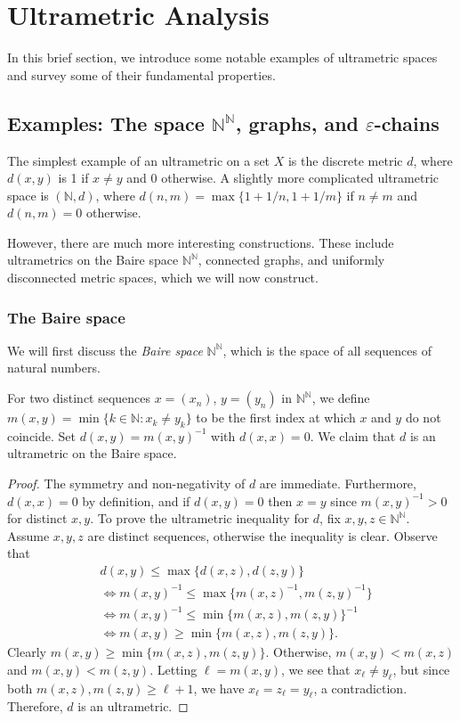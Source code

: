\section{Ultrametric Analysis}
In this brief section, we introduce some notable examples of ultrametric spaces and survey some of their fundamental properties.
\subsection{Examples: The space \( \mathbb{N} ^{\mathbb{N} } \), graphs, and \( \varepsilon  \)-chains} The simplest example of an ultrametric on a set $X$ is the discrete metric $d$, where $d(x,y)$ is 1 if $x \neq y$ and 0 otherwise. A slightly more complicated ultrametric space is \( (\mathbb{N} , d) \), where \( d(n,m) = \max \{ 1 + 1/n , 1 + 1/m \}  \) if \( n \neq m \) and \( d(n, m) = 0 \) otherwise.

However, there are much more interesting constructions. These include ultrametrics on the Baire space $\mathbb{N} ^{\mathbb{N} }$, connected graphs, and uniformly disconnected metric spaces, which we will now construct.

\subsubsection{The Baire space} We will first discuss the \emph{Baire space} \( \mathbb{N} ^{\mathbb{N} }  \), which is the space of all sequences of natural numbers.

For two distinct sequences \( x =  (x_{n}) \), \( y = (y_{n}) \) in \( \mathbb{N}^{\mathbb{N}}   \), we define \( m(x,y) = \min \{ k \in \mathbb{N} : x_{k} \neq y_{k}  \}  \) to be the first index at which \( x \) and \( y \) do not coincide. Set \( d(x,y) = m(x,y)^{-1}  \) with \( d(x,x) = 0 \). We claim that \( d \) is an ultrametric on the Baire space.
\begin{proof}
The symmetry and non-negativity of \( d \) are immediate. Furthermore, \( d(x,x) = 0 \) by definition, and if \( d(x,y) = 0  \) then \( x = y \) since \( m(x,y)^{-1} > 0 \) for distinct \( x,y \). To prove the ultrametric inequality for \( d \), fix \( x,y,z \in \mathbb{N} ^{\mathbb{N} }  \). Assume \( x,y,z \) are distinct sequences, otherwise the inequality is clear. Observe that
\begin{align*}
	&d(x,y) \leq \max \{ d(x,z), d(z,y) \} \\
	&\Leftrightarrow m(x,y)^{-1} \leq \max \{ m(x,z)^{-1} , m(z,y)^{-1}  \}  \\
	&\Leftrightarrow m(x,y)^{-1}  \leq \min \{ m(x,z), m(z,y) \} ^{-1} \\
	&\Leftrightarrow m(x,y) \geq \min \{ m(x,z), m(z,y) \}.
\end{align*}
Clearly \( m(x,y) \geq \min \{ m(x,z), m(z,y) \}  \). Otherwise, \( m(x,y) < m(x,z) \) and \( m(x,y) < m(z,y) \). Letting \( \ell = m(x,y) \), we see that \( x_{\ell} \neq y_{\ell}  \), but since both \( m(x,z), m(z,y) \geq \ell + 1 \), we have \( x_{\ell} = z_{\ell} = y_{\ell}  \), a contradiction. Therefore, \( d \) is an ultrametric.
\end{proof}
